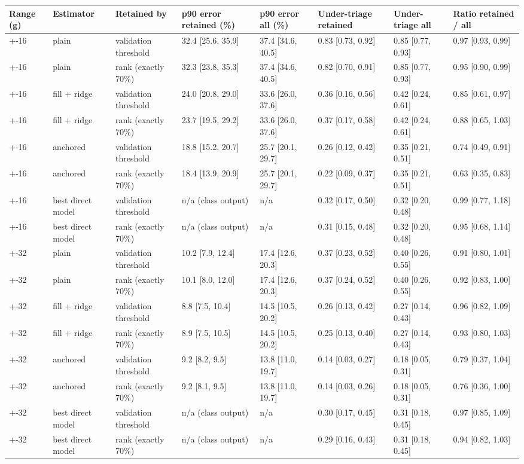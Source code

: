 \begin{tabular}{llllllll}
\toprule
Range (g) & Estimator & Retained by & p90 error retained (\%) & p90 error all (\%) & Under-triage retained & Under-triage all & Ratio retained / all \\
\midrule
+-16 & plain & validation threshold & 32.4 [25.6, 35.9] & 37.4 [34.6, 40.5] & 0.83 [0.73, 0.92] & 0.85 [0.77, 0.93] & 0.97 [0.93, 0.99] \\
+-16 & plain & rank (exactly 70\%) & 32.3 [23.8, 35.3] & 37.4 [34.6, 40.5] & 0.82 [0.70, 0.91] & 0.85 [0.77, 0.93] & 0.95 [0.90, 0.99] \\
+-16 & fill + ridge & validation threshold & 24.0 [20.8, 29.0] & 33.6 [26.0, 37.6] & 0.36 [0.16, 0.56] & 0.42 [0.24, 0.61] & 0.85 [0.61, 0.97] \\
+-16 & fill + ridge & rank (exactly 70\%) & 23.7 [19.5, 29.2] & 33.6 [26.0, 37.6] & 0.37 [0.17, 0.58] & 0.42 [0.24, 0.61] & 0.88 [0.65, 1.03] \\
+-16 & anchored & validation threshold & 18.8 [15.2, 20.7] & 25.7 [20.1, 29.7] & 0.26 [0.12, 0.42] & 0.35 [0.21, 0.51] & 0.74 [0.49, 0.91] \\
+-16 & anchored & rank (exactly 70\%) & 18.4 [13.9, 20.9] & 25.7 [20.1, 29.7] & 0.22 [0.09, 0.37] & 0.35 [0.21, 0.51] & 0.63 [0.35, 0.83] \\
+-16 & best direct model & validation threshold & n/a (class output) & n/a & 0.32 [0.17, 0.50] & 0.32 [0.20, 0.48] & 0.99 [0.77, 1.18] \\
+-16 & best direct model & rank (exactly 70\%) & n/a (class output) & n/a & 0.31 [0.15, 0.48] & 0.32 [0.20, 0.48] & 0.95 [0.68, 1.14] \\
+-32 & plain & validation threshold & 10.2 [7.9, 12.4] & 17.4 [12.6, 20.3] & 0.37 [0.23, 0.52] & 0.40 [0.26, 0.55] & 0.91 [0.80, 1.01] \\
+-32 & plain & rank (exactly 70\%) & 10.1 [8.0, 12.0] & 17.4 [12.6, 20.3] & 0.37 [0.24, 0.52] & 0.40 [0.26, 0.55] & 0.92 [0.83, 1.00] \\
+-32 & fill + ridge & validation threshold & 8.8 [7.5, 10.4] & 14.5 [10.5, 20.2] & 0.26 [0.13, 0.42] & 0.27 [0.14, 0.43] & 0.96 [0.82, 1.09] \\
+-32 & fill + ridge & rank (exactly 70\%) & 8.9 [7.5, 10.5] & 14.5 [10.5, 20.2] & 0.25 [0.13, 0.40] & 0.27 [0.14, 0.43] & 0.93 [0.80, 1.03] \\
+-32 & anchored & validation threshold & 9.2 [8.2, 9.5] & 13.8 [11.0, 19.7] & 0.14 [0.03, 0.27] & 0.18 [0.05, 0.31] & 0.79 [0.37, 1.04] \\
+-32 & anchored & rank (exactly 70\%) & 9.2 [8.1, 9.5] & 13.8 [11.0, 19.7] & 0.14 [0.03, 0.26] & 0.18 [0.05, 0.31] & 0.76 [0.36, 1.00] \\
+-32 & best direct model & validation threshold & n/a (class output) & n/a & 0.30 [0.17, 0.45] & 0.31 [0.18, 0.45] & 0.97 [0.85, 1.09] \\
+-32 & best direct model & rank (exactly 70\%) & n/a (class output) & n/a & 0.29 [0.16, 0.43] & 0.31 [0.18, 0.45] & 0.94 [0.82, 1.03] \\
\bottomrule
\end{tabular}
